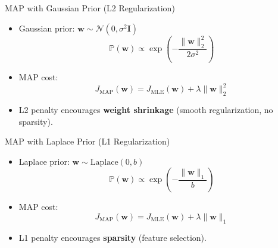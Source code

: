 \documentclass[serif, aspectratio=169]{beamer}
\begin{document}

\begin{frame}{MAP with Gaussian Prior (L2 Regularization)}
    \begin{itemize}
        \item Gaussian prior: $\mathbf{w} \sim \mathcal{N}(0, \sigma^2 \mathbf{I})$
        \[
            \mathbb{P}(\mathbf{w}) \propto \exp\left(-\frac{\|\mathbf{w}\|_2^2}{2\sigma^2}\right)
        \]
        \item MAP cost:
        \[
            J_{\text{MAP}}(\mathbf{w}) = J_{\text{MLE}}(\mathbf{w}) + \lambda \|\mathbf{w}\|_2^2
        \]
        \item L2 penalty encourages \textbf{weight shrinkage} (smooth regularization, no sparsity).
    \end{itemize}
\end{frame}


\begin{frame}{MAP with Laplace Prior (L1 Regularization)}
    \begin{itemize}
        \item Laplace prior: $\mathbf{w} \sim \text{Laplace}(0, b)$
        \[
            \mathbb{P}(\mathbf{w}) \propto \exp\left(-\frac{\|\mathbf{w}\|_1}{b}\right)
        \]
        \item MAP cost:
        \[
            J_{\text{MAP}}(\mathbf{w}) = J_{\text{MLE}}(\mathbf{w}) + \lambda \|\mathbf{w}\|_1
        \]
        \item L1 penalty encourages \textbf{sparsity} (feature selection).
    \end{itemize}
\end{frame}
\end{document}
